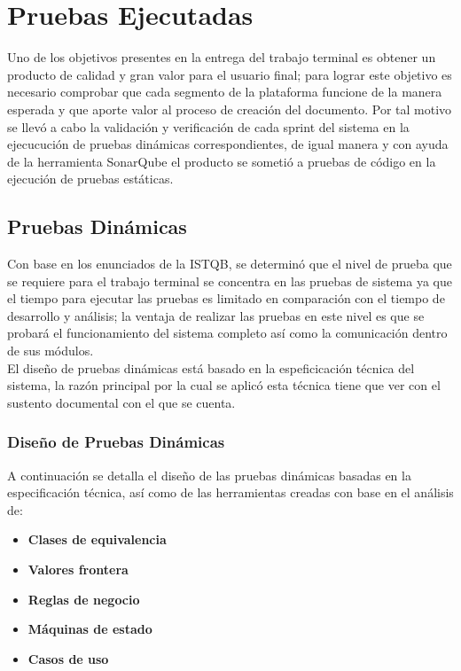 \chapter{Pruebas Ejecutadas} \label{cap:ocho}
Uno de los objetivos presentes en la entrega del trabajo terminal es obtener un producto de calidad y gran valor para el usuario final; para lograr este objetivo es necesario comprobar que cada segmento de la plataforma funcione de la manera esperada y que aporte valor al proceso de creación del documento. Por tal motivo se llevó a cabo la validación y verificación de cada sprint del sistema en la ejecucución de pruebas dinámicas correspondientes, de igual manera y con ayuda de la herramienta SonarQube el producto se sometió a pruebas de código en la ejecución de pruebas estáticas.

\section{Pruebas Dinámicas}

Con base en los enunciados de la ISTQB, se determinó que el nivel de prueba que se requiere para el trabajo terminal se concentra en las pruebas de sistema ya que el tiempo para ejecutar las pruebas es limitado en comparación con el tiempo de desarrollo y análisis; la ventaja de realizar las pruebas en este nivel es que se probará el funcionamiento del sistema completo así como la comunicación dentro de sus módulos.\\

El diseño de pruebas dinámicas está basado en la espeficicación técnica del sistema, la razón principal por la cual se aplicó esta técnica tiene que ver con el sustento documental con el que se cuenta.\\

\subsection{Diseño de Pruebas Dinámicas}

A continuación se detalla el diseño de las pruebas dinámicas basadas en la especificación técnica, así como de las herramientas creadas con base en el análisis de:

\begin{itemize}
	\item \textbf {Clases de equivalencia}
	\item \textbf {Valores frontera}
	\item \textbf {Reglas de negocio}
	\item \textbf {Máquinas de estado}
	\item \textbf {Casos de uso}
\end{itemize}

